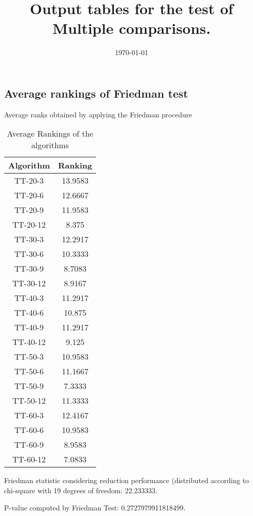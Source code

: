 \documentclass[a4paper,10pt]{article}
\title{Output tables for the test of Multiple comparisons.}
\author{}
\date{\today}
\begin{document}
\begin{landscape}
\pagestyle{empty}
\maketitle
\thispagestyle{empty}
\section{Average rankings of Friedman test}



Average ranks obtained by applying the Friedman procedure

\begin{table}[!htp]
\centering
\begin{tabular}{|c|c|}\hline
Algorithm&Ranking\\\hline
TT-20-3 & 13.9583\\
TT-20-6 & 12.6667\\
TT-20-9 & 11.9583\\
TT-20-12 & 8.375\\
TT-30-3 & 12.2917\\
TT-30-6 & 10.3333\\
TT-30-9 & 8.7083\\
TT-30-12 & 8.9167\\
TT-40-3 & 11.2917\\
TT-40-6 & 10.875\\
TT-40-9 & 11.2917\\
TT-40-12 & 9.125\\
TT-50-3 & 10.9583\\
TT-50-6 & 11.1667\\
TT-50-9 & 7.3333\\
TT-50-12 & 11.3333\\
TT-60-3 & 12.4167\\
TT-60-6 & 10.9583\\
TT-60-9 & 8.9583\\
TT-60-12 & 7.0833\\
\hline
\end{tabular}
\caption{Average Rankings of the algorithms}
\end{table}

Friedman statistic considering reduction performance (distributed according to chi-square with 19 degrees of freedom: 22.233333.

P-value computed by Friedman Test: 0.2727979911818499.\newline




\end{landscape}
\end{document}
